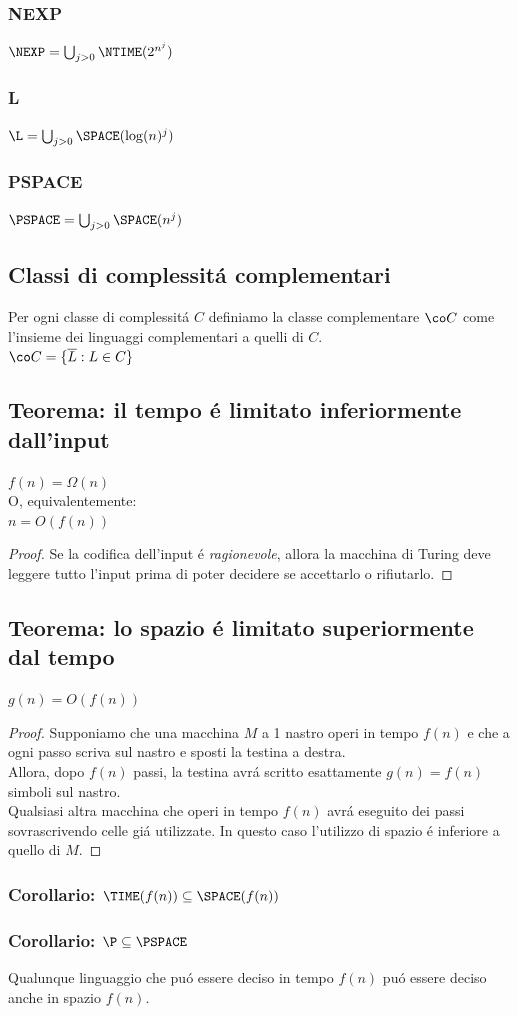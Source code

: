 \subsubsection{NEXP}
$\NEXP = \bigcup_{j>0} \NTIME(2^{n^j})$
\subsubsection{L}
$\L = \bigcup_{j>0} \SPACE(\log(n)^j)$
\subsubsection{PSPACE}
$\PSPACE = \bigcup_{j>0} \SPACE(n^j)$

\subsection{Classi di complessitá complementari}
Per ogni classe di complessitá $C$ definiamo la classe complementare $\co C$ come l'insieme dei linguaggi complementari a quelli di $C$. \\
$\co C = \{ \overline{L} : L \in C \}$


\subsection{Teorema: il tempo é limitato inferiormente dall'input}
\label{teorema:tempo_limitato_inferiormente_dall_input}
{$f(n) = \Omega(n)$} \\
O, equivalentemente: \\
{$n = O(f(n))$}
\begin{proof}
Se la codifica dell'input é \textit{ragionevole}, allora la macchina di Turing deve leggere tutto l'input prima di poter decidere se accettarlo o rifiutarlo.
\end{proof}


\subsection{Teorema: lo spazio é limitato superiormente dal tempo}
\label{teorema:spazio_limitato_superiormente_dal_tempo}
{$g(n) = O(f(n))$}
\begin{proof}
Supponiamo che una macchina $M$ a 1 nastro operi in tempo $f(n)$ e che a ogni passo scriva sul nastro e sposti la testina a destra. \\
Allora, dopo $f(n)$ passi, la testina avrá scritto esattamente $g(n) = f(n)$ simboli sul nastro. \\
Qualsiasi altra macchina che operi in tempo $f(n)$ avrá eseguito dei passi sovrascrivendo celle giá utilizzate. In questo caso l'utilizzo di spazio é inferiore a quello di $M$.
\end{proof}
\subsubsection{Corollario: $\TIME(f(n)) \subseteq \SPACE(f(n))$}
\subsubsection{Corollario: $\P \subseteq \PSPACE$}
Qualunque linguaggio che puó essere deciso in tempo $f(n)$ puó essere deciso anche in spazio $f(n)$.
